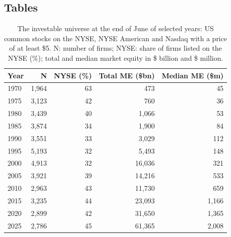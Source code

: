 \documentclass[12pt,a4paper]{article}
\begin{document}
\clearpage
\begin{singlespace}
\small
\section*{Tables}
\setcounter{topnumber}{4}\setcounter{totalnumber}{6}\renewcommand{\topfraction}{0.95}\renewcommand{\textfraction}{0.05}

\begin{table}[!htbp]\centering
\caption{The investable universe at the end of June of selected years: US common stocks on the NYSE, NYSE American and Nasdaq with a price of at least \$5. N: number of firms; NYSE: share of firms listed on the NYSE (\%); total and median market equity in \$ billion and \$ million.}\label{tab:sample}
\footnotesize
\begin{tabular}{lrrrr}\toprule
Year & N & NYSE (\%) & Total ME (\$bn) & Median ME (\$m)\\\midrule
1970 & 1,964 & 63 & 473 & 45\\
1975 & 3,123 & 42 & 760 & 36\\
1980 & 3,439 & 40 & 1,066 & 53\\
1985 & 3,874 & 34 & 1,900 & 84\\
1990 & 3,551 & 33 & 3,029 & 112\\
1995 & 5,193 & 32 & 5,493 & 148\\
2000 & 4,913 & 32 & 16,036 & 321\\
2005 & 3,921 & 39 & 14,216 & 533\\
2010 & 2,963 & 43 & 11,730 & 659\\
2015 & 3,235 & 44 & 23,093 & 1,166\\
2020 & 2,899 & 42 & 31,650 & 1,365\\
2025 & 2,786 & 45 & 61,365 & 2,008\\
\bottomrule\end{tabular}
\end{table}


\end{singlespace}
\end{document}
